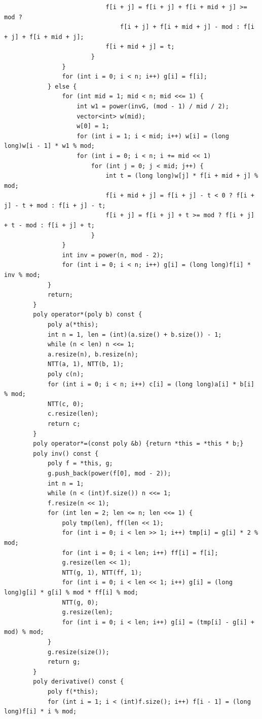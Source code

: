 \begin{verbatim}
                            f[i + j] = f[i + j] + f[i + mid + j] >= mod ?
                                f[i + j] + f[i + mid + j] - mod : f[i + j] + f[i + mid + j];
                            f[i + mid + j] = t;
                        }
                }
                for (int i = 0; i < n; i++) g[i] = f[i];
            } else {
                for (int mid = 1; mid < n; mid <<= 1) {
                    int w1 = power(invG, (mod - 1) / mid / 2);
                    vector<int> w(mid);
                    w[0] = 1;
                    for (int i = 1; i < mid; i++) w[i] = (long long)w[i - 1] * w1 % mod;
                    for (int i = 0; i < n; i += mid << 1)
                        for (int j = 0; j < mid; j++) {
                            int t = (long long)w[j] * f[i + mid + j] % mod;
                            f[i + mid + j] = f[i + j] - t < 0 ? f[i + j] - t + mod : f[i + j] - t;
                            f[i + j] = f[i + j] + t >= mod ? f[i + j] + t - mod : f[i + j] + t;
                        }
                }
                int inv = power(n, mod - 2);
                for (int i = 0; i < n; i++) g[i] = (long long)f[i] * inv % mod;
            }
            return;
        }
        poly operator*(poly b) const {
            poly a(*this);
            int n = 1, len = (int)(a.size() + b.size()) - 1;
            while (n < len) n <<= 1;
            a.resize(n), b.resize(n);
            NTT(a, 1), NTT(b, 1);
            poly c(n);
            for (int i = 0; i < n; i++) c[i] = (long long)a[i] * b[i] % mod;
            NTT(c, 0);
            c.resize(len);
            return c;
        }
        poly operator*=(const poly &b) {return *this = *this * b;}
        poly inv() const {
            poly f = *this, g;
            g.push_back(power(f[0], mod - 2));
            int n = 1;
            while (n < (int)f.size()) n <<= 1;
            f.resize(n << 1);
            for (int len = 2; len <= n; len <<= 1) {
                poly tmp(len), ff(len << 1);
                for (int i = 0; i < len >> 1; i++) tmp[i] = g[i] * 2 % mod;
                for (int i = 0; i < len; i++) ff[i] = f[i];
                g.resize(len << 1);
                NTT(g, 1), NTT(ff, 1);
                for (int i = 0; i < len << 1; i++) g[i] = (long long)g[i] * g[i] % mod * ff[i] % mod;
                NTT(g, 0);
                g.resize(len);
                for (int i = 0; i < len; i++) g[i] = (tmp[i] - g[i] + mod) % mod;
            }
            g.resize(size());
            return g;
        }
        poly derivative() const {
            poly f(*this);
            for (int i = 1; i < (int)f.size(); i++) f[i - 1] = (long long)f[i] * i % mod;

\end{verbatim}
